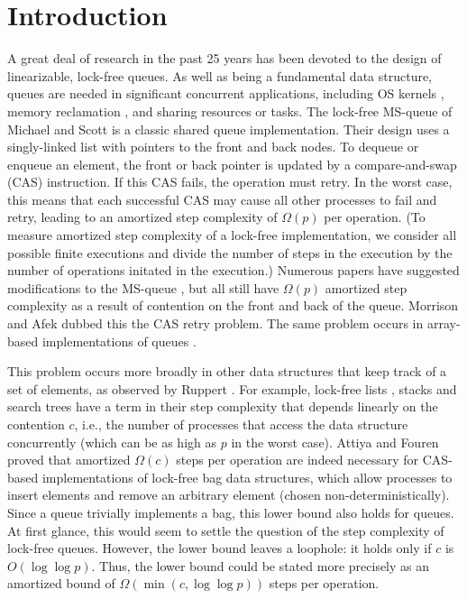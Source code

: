 
\section{Introduction}

A great deal of research in the past 25 years has been devoted to the design of linearizable, lock-free queues.
As well as being a fundamental data structure, queues are needed in
significant concurrent applications, including OS kernels \cite{MP91}, memory reclamation \cite{?},
and sharing resources or tasks.
The lock-free MS-queue of Michael and Scott \cite{DBLP:conf/podc/MichaelS96} is a classic shared queue implementation.
Their design uses a singly-linked list with pointers to the front and back nodes.
To dequeue or enqueue an element, the front or back pointer is updated by a 
compare-and-swap (CAS) instruction.
If this CAS fails, the operation must retry.
In the worst case, this means that each successful CAS may cause all other processes to
fail and retry, leading to an amortized step complexity of $\Omega(p)$ per operation.
(To measure amortized step complexity of a lock-free implementation, we consider all possible finite executions
and divide the number of steps in the execution by the number of operations initated in the execution.)
Numerous papers have suggested modifications to the MS-queue \cite{list-some}, but 
all still have $\Omega(p)$ amortized step complexity as a result of
contention on the front and back of the queue.
Morrison and Afek \cite{DBLP:conf/ppopp/MorrisonA13} dubbed this the CAS retry problem.
The same problem occurs in array-based implementations of queues \cite{list-some}.

This problem occurs more broadly in other data structures that keep track of a set of elements, as observed by Ruppert \cite{Rup16}.
For example, lock-free lists \cite{FR04,Sha15}, stacks \cite{Tre86} and search trees \cite{EFHR14} 
have a term in their step complexity
that depends linearly on the contention $c$, i.e., 
the number of processes that access the data structure concurrently (which can be as high
as $p$ in the worst case).
Attiya and Fouren \cite{DBLP:conf/opodis/AttiyaF17} proved 
that amortized $\Omega(c)$ steps per operation are indeed necessary
for CAS-based implementations of lock-free bag data structures, which allow processes
to insert elements and remove an arbitrary element (chosen non-deterministically).
Since a queue trivially implements a bag, this lower bound also holds for queues.
At first glance, this would seem to settle the question of the step complexity of lock-free queues.
However, the lower bound leaves a loophole:  it holds only if $c$ is $O(\log\log p)$.
Thus, the lower bound could be stated more precisely as an amortized bound of $\Omega(\min(c,\log\log p))$ steps per operation.

